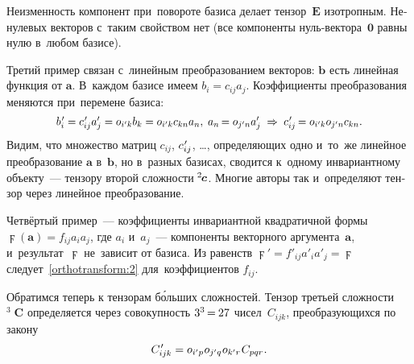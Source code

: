 \begin{otherlanguage}{russian}
Неизменность компонент при~повороте базиса делает тензор~${\bm{E}}$ изотропным. Ненулевых векторов с~таким свойством нет (все компоненты нуль\hbox{-}вектора~$\bm{0}$ равны нулю в~любом базисе).

Третий пример связан с~линейным преобразованием векторов: ${\bm{b}}$ есть линейная функция от ${\bm{a}}$. В~каждом базисе имеем ${b_i = c_{ij} a_j}$. Коэффициенты преобразования меняются при~перемене базиса:
\[
\scalebox{0.96}[1]{$b\hspace{0.16ex}'_{\hspace{-0.16ex}i} = c\hspace{0.16ex}'_{\hspace{-0.16ex}ij} a'_j = \cosinematrix{i'k} b_k = \cosinematrix{i'k} c_{kn} a_n ,\;
a_n \hspace{-0.25ex} = \cosinematrix{j'n} a'_j \;\Rightarrow\; c\hspace{0.16ex}'_{\hspace{-0.16ex}ij} \hspace{-0.2ex} = \cosinematrix{i'k} \cosinematrix{j'n} c_{kn}$}.
\]
\noindent Видим, что множество матриц ${c_{ij}}$, ${c\hspace{0.16ex}'_{\hspace{-0.16ex}ij}}$, \dots, определяющих одно и~то~же линейное преобразование ${\bm{a}}$ в~${\bm{b}}$, но в~разных базисах, сводится к~одному инвариантному объекту~--- тензору второй сложности ${\hspace{-0.1ex} ^2\hspace{-0.2ex}\bm{c}}$. Многие авторы так и~определяют тензор через линейное преобразование.

Четвёртый пример~--- коэффициенты инвариантной квадратичной формы ${\digamma(\bm{a}) = f_{ij} a_i a_j}$, где ${a_i}$ и~${a_j}$~--- компоненты векторного аргумента~${\bm{a}}$, и~результат~${\digamma}$ не~зависит от базиса. Из равенств ${\digamma' = f'_{ij} a'_i a'_j = \digamma}$ следует~\eqref{orthotransform:2} для~коэффициентов ${f_{ij}}$.

Обратимся теперь к тензорам б\'{о}льших сложностей. Тензор третьей сложности ${^3\!\!\;\bm{C}}$ определяется через совокупность ${3^3 \hspace{-0.24ex}=\hspace{-0.12ex} 27}$ чисел~${C_{ijk}}$, преобразующихся по закону
\begin{equation}\label{orthotransform:3}
C\hspace{0.16ex}'_{\hspace{-0.32ex}ijk} = o_{i'p} \hspace{.1ex} o_{j'q} \hspace{.1ex} o_{k'r} \hspace{.16ex} C_{pqr} \hspace{.1ex}.
\end{equation}


\end{otherlanguage}
